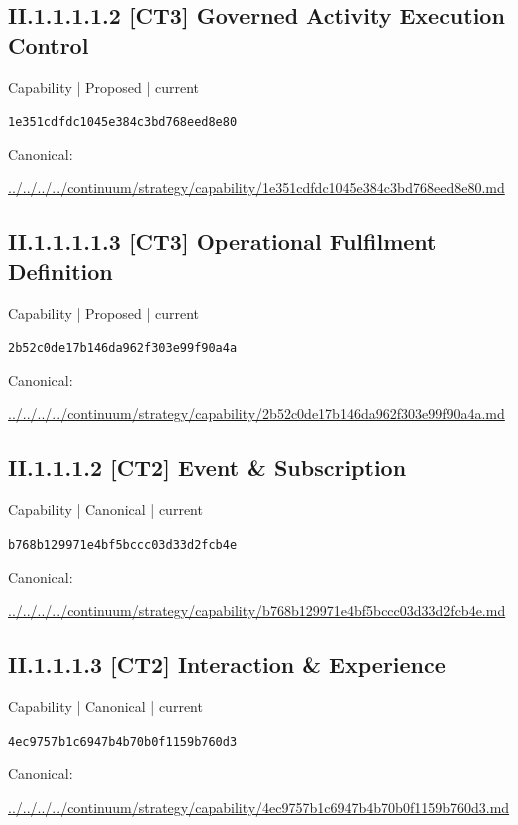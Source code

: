 \documentclass[10pt,a4paper]{article}
\begin{document}
\subsection*{II.1.1.1.1.2 [CT3] Governed Activity Execution Control}
{\small Capability | Proposed | current}\par
\texttt{1e351cdfdc1045e384c3bd768eed8e80}\par
Canonical: \par
{\footnotesize\url{../../../../continuum/strategy/capability/1e351cdfdc1045e384c3bd768eed8e80.md}}\par
\subsection*{II.1.1.1.1.3 [CT3] Operational Fulfilment Definition}
{\small Capability | Proposed | current}\par
\texttt{2b52c0de17b146da962f303e99f90a4a}\par
Canonical: \par
{\footnotesize\url{../../../../continuum/strategy/capability/2b52c0de17b146da962f303e99f90a4a.md}}\par
\subsection*{II.1.1.1.2 [CT2] Event \& Subscription}
{\small Capability | Canonical | current}\par
\texttt{b768b129971e4bf5bccc03d33d2fcb4e}\par
Canonical: \par
{\footnotesize\url{../../../../continuum/strategy/capability/b768b129971e4bf5bccc03d33d2fcb4e.md}}\par
\subsection*{II.1.1.1.3 [CT2] Interaction \& Experience}
{\small Capability | Canonical | current}\par
\texttt{4ec9757b1c6947b4b70b0f1159b760d3}\par
Canonical: \par
{\footnotesize\url{../../../../continuum/strategy/capability/4ec9757b1c6947b4b70b0f1159b760d3.md}}\par
\end{document}
